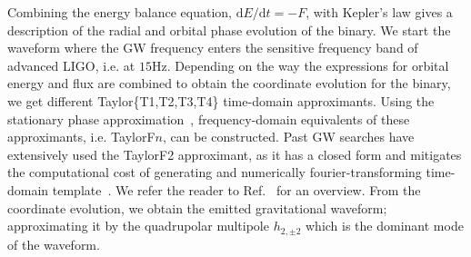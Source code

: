 \documentclass[aps,
prd,
twocolumn,
superscriptaddress,
lengthcheck,showpacs,letterpaper,nofootinbib,
floatfix]{revtex4-1}
\newcommand{\D}{\mathrm{d}}
\def\l({\left(}
\def\r){\right)}
\begin{document}
Combining the energy balance equation, $\D E/\D t = -F$, with Kepler's law 
gives a description of the radial and orbital phase evolution of the binary. 
We start the waveform where the GW frequency enters the sensitive frequency 
band of advanced LIGO, i.e. at $15$Hz. 
Depending on the way the expressions for orbital energy and flux
are combined to obtain the coordinate evolution for the binary,
we get different Taylor\{T1,T2,T3,T4\} time-domain approximants. Using the 
stationary phase approximation~\cite{MatthewsWalker}, frequency-domain 
equivalents of these approximants, i.e. TaylorF$n$, can be constructed. 
Past GW searches have extensively used the TaylorF2 approximant, as it has a
closed form and mitigates the computational cost of generating and numerically
fourier-transforming time-domain template~\cite{Colaboration:2011nz,Abadie:2010yb,
Abbott:2009qj,Abbott:2009tt,Messaritaki:2005wv}.
We refer the reader to Ref.~\cite{PNtheoryLivingReviewBlanchet,JolienGWPhysAst}
for an overview.
From the coordinate evolution, we obtain the emitted gravitational waveform;
approximating it by the quadrupolar multipole $h_{2,\pm 2}$ which is the 
dominant mode of the waveform.
\end{document}
